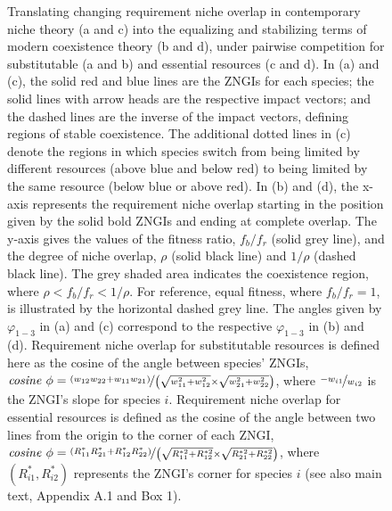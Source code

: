 \begin{figure}[h!]
	{\hspace{1mm}Translating changing requirement niche overlap in contemporary niche theory (a and c) into the equalizing and stabilizing terms of modern coexistence theory (b and d), under pairwise competition for substitutable (a and b) and essential resources (c and d). In (a) and (c), the solid red and blue lines are the ZNGIs for each species; the solid lines with arrow heads are the respective impact vectors; and the dashed lines are the inverse of the impact vectors, defining regions of stable coexistence. The additional dotted lines in (c) denote the regions in which species switch from being limited by different resources (above blue and below red) to being limited by the same resource (below blue or above red). In (b) and (d), the x-axis represents the requirement niche overlap starting in the position given by the solid bold ZNGIs and ending at complete overlap. The y-axis gives the values of the fitness ratio, $f_{b}/f_{r}$ (solid grey line), and the degree of niche overlap, $\rho$ (solid black line) and $1/\rho$ (dashed black line). The grey shaded area indicates the coexistence region, where $\rho<f_{b}/f_{r}<1/\rho$. For reference, equal fitness, where $f_{b}/f_{r}=1$, is illustrated by the horizontal dashed grey line. The angles given by $\varphi_{1-3}$ in (a) and (c) correspond to the respective $\varphi_{1-3}$ in (b) and (d). Requirement niche overlap for substitutable resources is defined here as the cosine of the angle between species' ZNGIs, $\mathit{cosine}\ \phi  = \nicefrac{\left( w_{12}w_{22}+w_{11}w_{21} \right)}{\left( \sqrt{w_{11}^{2}+w_{12}^{2}} \times \sqrt{w_{21}^{2}+w_{22}^{2}} \right)}$, where $\nicefrac{-w_{i1}}{w_{i2}}$ is the ZNGI's slope for species $\mathit{i}$. Requirement niche overlap for essential resources is defined as the cosine of the angle between two lines from the origin to the corner of each ZNGI, $\mathit{cosine}\ \phi  = \nicefrac{\left( R_{11}^{*}R_{21}^{*}+R_{12}^{*}R_{22}^{*} \right)}{\left( \sqrt{R_{11}^{*2}+R_{12}^{*2}}\times \sqrt{R_{21}^{*2}+R_{22}^{*2}} \right)}$, where $\left (R_{i1}^{*}, R_{i2}^{*}\right )$ represents the ZNGI's corner for species $\mathit{i}$ (see also main text, Appendix A.1 and Box 1).}
\label{fig:require-ms-fig-fixedequilibrium}
\end{figure}



